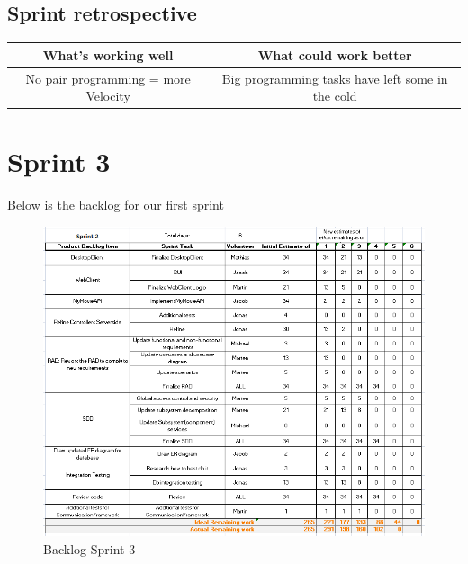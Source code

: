 \subsection{Sprint retrospective}

\begin{center}
\begin{tabular}{|c|c|}
\hline \textbf{What's working well} & \textbf{What could work better} \\ 
\hline No pair programming = more Velocity & Big programming tasks have left some in the cold \\ 
\hline 
\end{tabular} 
\end{center}




\newpage
\section{Sprint 3}
\label{chap:Spring 3}
Below is the backlog for our first sprint
\begin{figure}[h]
\includegraphics[scale=0.75]{img/SCRUM/backlogSprint3.png}
\caption{Backlog Sprint 3}
\label{fig:Backlog Sprint 3}
\end{figure}

\newpage
